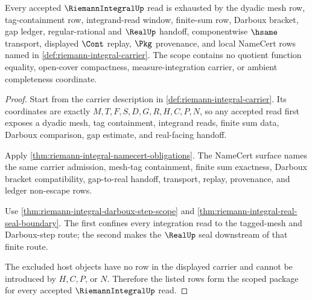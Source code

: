 \begin{theorem}
\label{thm:riemann-integral-scope-closure-package}
Every accepted $\RiemannIntegralUp$ read is exhausted by the dyadic mesh row, tag-containment row, integrand-read window, finite-sum row, Darboux bracket, gap ledger, regular-rational and $\RealUp$ handoff, componentwise $\hsame$ transport, displayed $\Cont$ replay, $\Pkg$ provenance, and local NameCert rows named in \autoref{def:riemann-integral-carrier}. The scope contains no quotient function equality, open-cover compactness, measure-integration carrier, or ambient completeness coordinate.
\end{theorem}
\begin{proof}
Start from the carrier description in \autoref{def:riemann-integral-carrier}. Its coordinates are exactly $M,T,F,S,D,G,R,H,C,P,N$, so any accepted read first exposes a dyadic mesh, tag containment, integrand reads, finite sum data, Darboux comparison, gap estimate, and real-facing handoff.

Apply \autoref{thm:riemann-integral-namecert-obligations}. The NameCert surface names the same carrier admission, mesh-tag containment, finite sum exactness, Darboux bracket compatibility, gap-to-real handoff, transport, replay, provenance, and ledger non-escape rows.

Use \autoref{thm:riemann-integral-darboux-step-scope} and \autoref{thm:riemann-integral-real-seal-boundary}. The first confines every integration read to the tagged-mesh and Darboux-step route; the second makes the $\RealUp$ seal downstream of that finite route.

The excluded host objects have no row in the displayed carrier and cannot be introduced by $H,C,P$, or $N$. Therefore the listed rows form the scoped package for every accepted $\RiemannIntegralUp$ read.
\end{proof}

